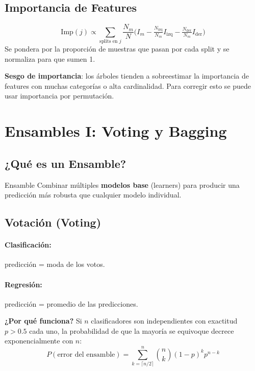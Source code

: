 \documentclass[12pt, a4paper]{article}
\begin{document}
\subsection{Importancia de Features}

\[
	\text{Imp}(j) \propto \sum_{\text{splits en }j}
	\frac{N_m}{N}\bigl(I_m - \tfrac{N_{\text{izq}}}{N_m}I_{\text{izq}}
	- \tfrac{N_{\text{der}}}{N_m}I_{\text{der}}\bigr)
\]
Se pondera por la proporción de muestras que pasan por cada split y se normaliza para que
sumen 1.

\begin{notebox}
	\textbf{Sesgo de importancia}: los árboles tienden a sobreestimar la importancia de
	features con muchas categorías o alta cardinalidad. Para corregir esto se puede usar
	importancia por permutación.
\end{notebox}

\section{Ensambles I: Voting y Bagging}

\subsection{¿Qué es un Ensamble?}

\begin{defbox}{Ensamble}
	Combinar múltiples \textbf{modelos base} (learners) para producir una predicción
	más robusta que cualquier modelo individual.
\end{defbox}

\subsection{Votación (Voting)}

\paragraph{Clasificación:} predicción = moda de los votos.
\paragraph{Regresión:} predicción = promedio de las predicciones.

\textbf{¿Por qué funciona?}
Si $n$ clasificadores son independientes con exactitud $p > 0.5$ cada uno, la probabilidad
de que la mayoría se equivoque decrece exponencialmente con $n$:
\[
	P(\text{error del ensamble}) = \sum_{k=\lceil n/2\rceil}^{n}\binom{n}{k}(1-p)^k p^{n-k}
\]
\end{document}
